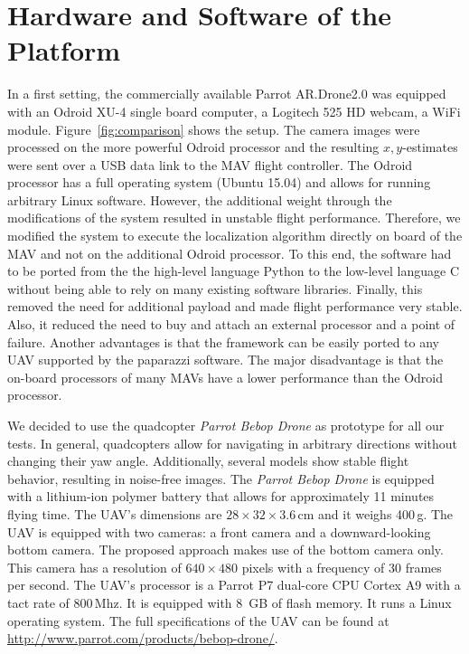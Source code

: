\DeclareMathOperator*{\argmin}{arg\,min}
\DeclareMathOperator*{\argmax}{arg\,max}

\section{Hardware and Software of the Platform}
\label{sec:hardware}

In a first setting, the commercially available Parrot AR.Drone2.0 was
equipped with an Odroid XU-4 single board computer, a Logitech 525 HD
webcam, a WiFi module. Figure~\ref{fig:comparison} shows the setup. The camera images were processed on the more powerful Odroid processor and the resulting $x,y$-estimates were sent over a USB data link to the MAV flight controller. The Odroid processor has a full operating system (Ubuntu 15.04) and
allows for running arbitrary Linux software.
However, the additional weight through the modifications of the system resulted in unstable flight performance. Therefore, we modified the system to execute the localization algorithm directly on board of the MAV and not on the additional Odroid processor. To this end, the software had to be ported from the the high-level language
Python to the low-level language C without being able to rely on many
existing software libraries.
Finally, this removed the need for additional payload and made flight performance
very stable. Also, it reduced the need to buy and attach an external
processor and a point of failure. Another advantages is that the
framework can be easily ported to any UAV supported by the paparazzi
software. The major disadvantage is that the on-board processors of many
MAVs have a lower performance than the Odroid processor.

We decided to use the quadcopter \emph{Parrot Bebop Drone}
as prototype for all our tests. In general, quadcopters allow for navigating in
arbitrary directions without changing their yaw angle. Additionally,
several models show stable flight behavior, resulting in noise-free
images. The \emph{Parrot Bebop Drone} is equipped with a lithium-ion polymer battery that allows for approximately 11 minutes flying time. The UAV's dimensions are $28 \times 32 \times 3.6$\,cm
and it weighs 400\,g. The UAV is equipped with two cameras: a front camera and a
downward-looking bottom camera. The proposed approach makes use of the
bottom camera only. This camera has a resolution of $640 \times 480$
pixels with a frequency of 30 frames per second. The UAV's processor
is a Parrot P7 dual-core CPU Cortex A9 with a tact rate of
800\,Mhz. It is equipped with 8~GB of flash memory. It runs a Linux
operating system. The full specifications of the UAV can be found at
\url{http://www.parrot.com/products/bebop-drone/}.

